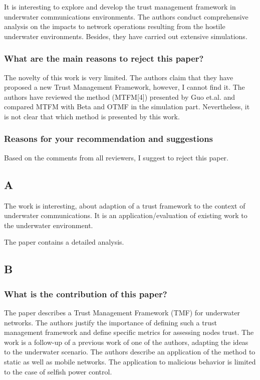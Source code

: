 \documentclass[runningheads,a4paper]{llncs}
\begin{document}
It is interesting to explore and develop the trust management framework in underwater communications environments. The authors conduct comprehensive analysis on the impacts to network operations resulting from the hostile underwater environments. Besides, they have carried out extensive simulations.

\subsubsection{What are the main reasons to reject this paper?}

The novelty of this work is very limited. The authors claim that they have proposed a new Trust Management Framework, however, I cannot find it. The authors have reviewed the method (MTFM[4]) presented by Guo et.al. and compared MTFM with Beta and OTMF in the simulation part. Nevertheless, it is not clear that which method is presented by this work.

\subsubsection{Reasons for your recommendation and suggestions}

Based on the comments from all reviewers, I suggest to reject this paper.

\subsection{A}

The work is interesting, about adaption of a trust framework to the context of underwater communications. It is an application/evaluation of existing work to the underwater environment.

The paper contains a detailed analysis.


\subsection{B}
\subsubsection{What is the contribution of this paper?}

The paper describes a Trust Management Framework (TMF) for underwater networks. The authors justify the importance of defining such a trust management framework and define specific metrics for assessing nodes trust. The work is a follow-up of a previous work of one of the authors, adapting the ideas to the underwater scenario. The authors describe an application of the method to static as well as mobile networks. The application to malicious behavior is limited to the case of selfish power control.
\end{document}
